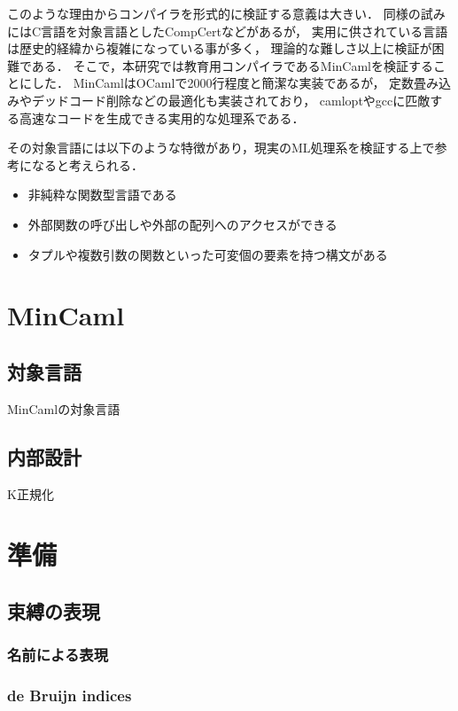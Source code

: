 \documentclass{sumiilab-paper}
\begin{document}
このような理由からコンパイラを形式的に検証する意義は大きい．
同様の試みにはC言語を対象言語としたCompCert\cite{2006-Leroy-Blazy-Dargaye}などがあるが，
実用に供されている言語は歴史的経緯から複雑になっている事が多く，
理論的な難しさ以上に検証が困難である．
そこで，本研究では教育用コンパイラであるMinCaml\cite{DBLP:conf/icfp/Sumii05}を検証することにした．
MinCamlはOCamlで2000行程度と簡潔な実装であるが，
定数畳み込みやデッドコード削除などの最適化も実装されており，
camloptやgccに匹敵する高速なコードを生成できる実用的な処理系である．

その対象言語には以下のような特徴があり，現実のML処理系を検証する上で参考になると考えられる．
\begin{itemize}
	\item 非純粋な関数型言語である
	\item 外部関数の呼び出しや外部の配列へのアクセスができる
	\item タプルや複数引数の関数といった可変個の要素を持つ構文がある
\end{itemize}

\chapter{MinCaml}
\section{対象言語}
MinCamlの対象言語

\section{内部設計}

K正規化

\chapter{準備}

\section{束縛の表現}

\subsection{名前による表現}

\subsection{de Bruijn indices}
\end{document}
